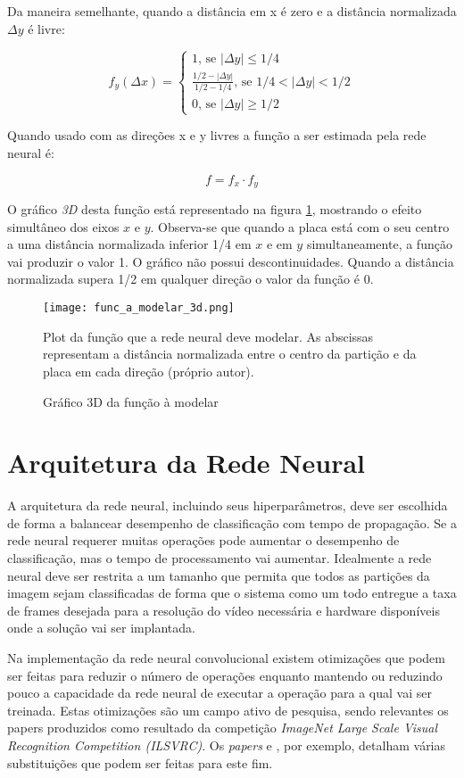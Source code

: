 Da maneira semelhante, quando a distância em x é zero e a distância 
normalizada $\Delta y$ é livre:

\begin{equation}
	f_y(\Delta x) = \begin{cases}
		1 \text{, se } |\Delta y| \leq 1/4
		\\
		\frac{1/2-|\Delta y|}{1/2-1/4} \text{, se } 1/4<|\Delta y|<1/2
		\\
		0 \text{, se } |\Delta y| \geq 1/2
	\end{cases}
\end{equation}

Quando usado com as direções x e y livres a função a ser estimada pela rede
neural é:

\begin{equation} \label{eq:funcao_a_modelar}
	f=f_x \cdot f_y
\end{equation}

O gráfico \emph{3D} desta função está representado na figura
\ref{fig:func_a_modelar_3d}, mostrando o
efeito simultâneo dos eixos $x$ e $y$.  Observa-se que quando a placa
está com o seu centro a uma distância normalizada inferior 1/4 em $x$ e em $y$
simultaneamente, a função vai produzir o valor 1. O gráfico não possui
descontinuidades. Quando a distância normalizada supera 1/2 em qualquer
direção o valor da função é 0.

\begin{figure}[!htb]
	\centering
	\texttt{[image: func\_a\_modelar\_3d.png]}
	\caption{Gráfico 3D da função à modelar}
	\label{fig:func_a_modelar_3d}
	Plot da função que a rede neural deve modelar. As abscissas representam a
	distância normalizada entre o centro da partição e da placa em cada direção
	(próprio autor).
\end{figure}


\section{Arquitetura da Rede Neural}

A arquitetura da rede neural, incluindo seus hiperparâmetros, deve ser
escolhida de forma a balancear desempenho de classificação com tempo de
propagação. Se a rede neural requerer muitas operações pode aumentar o
desempenho de classificação, mas o tempo de processamento vai aumentar.
Idealmente a rede neural deve ser restrita a um tamanho que permita que todos
as partições da imagem sejam classificadas de forma que o sistema como um todo
entregue a taxa de frames desejada para a resolução do vídeo necessária e
hardware disponíveis onde a solução vai ser implantada.

Na implementação da rede neural convolucional existem otimizações que podem ser
feitas para reduzir o número de operações enquanto mantendo ou reduzindo pouco
a capacidade da rede neural de executar a operação para a qual vai ser
treinada. Estas otimizações são um campo ativo de pesquisa, sendo relevantes os
papers produzidos como resultado da competição \emph{ImageNet Large Scale
Visual Recognition Competition (ILSVRC)}. Os \emph{papers}
\cite{szegedy2015going} e \cite{szegedy2015rethinking},
por exemplo, detalham várias substituições que podem ser feitas para este fim.


